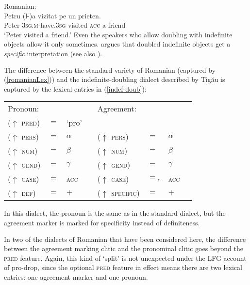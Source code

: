 \documentclass[output=paper,hidelinks]{langscibook}
\begin{document}
 

\ea  \label{rom5}Romanian:\\
  \gll Petru (l-)a vizitat  pe un prieten. \\
 Peter 3\textsc{sg.m}-have.3\textsc{sg}  visited \textsc{acc} a friend\\
 \glt `Peter visited a friend.' 
 \z
Even the speakers who allow doubling with indefinite objects   allow it only sometimes. \citet{tigau2010, tigau2014} argues that   doubled indefinite objects get a \textit{specific} interpretation  (see also \citealt[Chapter 3]{aoun81}). 

The difference between the  standard variety of Romanian  (captured by    (\ref{romanianLex})) and the indefinite-doubling dialect described by Tig\u{a}u  is captured by the lexical entries in (\ref{indef-doub}): 
      
 
  \ea \label{indef-doub}\begin{tabular}[t]{llllllll }
{Pronoun:} &&&&{Agreement:} &&& \\
($\uparrow$ \textsc{pred}) & $=$ & `pro'  &\\
 ($\uparrow$ \textsc{pers}) & $=$ & $\alpha$ & {\hspace{.2in} } &($\uparrow$ \textsc{pers}) & $=$ & $\alpha$  \\
 ($\uparrow$ \textsc{num}) & $=$ &  $\beta$  &&  ($\uparrow$ \textsc{num}) & $=$ &  $\beta$ \\
($\uparrow$ \textsc{gend}) & $=$ &   $\gamma$   &&($\uparrow$ \textsc{gend}) & $=$ &   $\gamma$  \\
 ($\uparrow$ \textsc{case}) & $=$ &  \textsc{acc}    && ($\uparrow$ \textsc{case}) & $=$$_c$ &  \textsc{acc}   \\
 ($\uparrow$ \textsc{def}) & $=$  &  $+$ &&   ($\uparrow$ \textsc{specific}) & $=$  &    $+$  \\
 \end{tabular}
 \z
     In this dialect, the pronoun is the same as  in the  standard dialect, but the agreement marker    is marked for specificity instead of definiteness.   

 
 In two  of the dialects of Romanian that have been considered here,  the difference between the agreement marking clitic and   the pronominal clitic goes  beyond the \textsc{pred} feature.  Again, this kind of `split' is not unexpected under the LFG account of pro-drop, since the optional \textsc{pred} feature in effect means there are two lexical entries: one agreement marker and one pronoun. 
 
\end{document}
